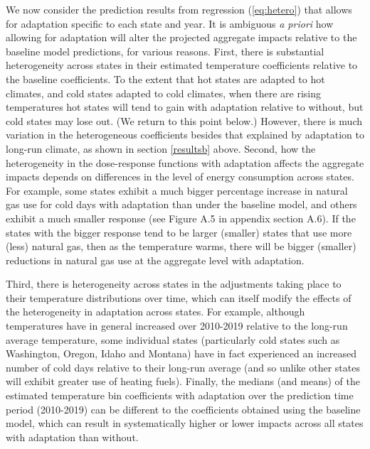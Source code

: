 \documentclass[11pt]{article}
\begin{document}
We now consider the prediction results from regression (\ref{eq:hetero}) that allows for adaptation specific to each state and year. It is ambiguous \textit{a priori} how allowing for adaptation will alter the projected aggregate impacts relative to the baseline model predictions, for various reasons. First, there is substantial heterogeneity across states in their estimated temperature coefficients relative to the baseline coefficients. To the extent that hot states are adapted to hot climates, and cold states adapted to cold climates, when there are rising temperatures hot states will tend to gain with adaptation relative to without, but cold states may lose out. (We return to this point below.) However, there is much variation in the heterogeneous coefficients besides that explained by adaptation to long-run climate, as shown in section \ref{resultsb} above. Second, how the heterogeneity in the dose-response functions with adaptation affects the aggregate impacts depends on differences in the level of energy consumption across states. For example, some states exhibit a much bigger percentage increase in natural gas use for cold days with adaptation than under the baseline model, and others exhibit a much smaller response (see Figure A.5 in appendix section A.6). If the states with the bigger response tend to be larger (smaller) states that use more (less) natural gas, then as the temperature warms, there will be bigger (smaller) reductions in natural gas use at the aggregate level with adaptation. 

Third, there is heterogeneity across states in the adjustments taking place to their temperature distributions over time, which can itself modify the effects of the heterogeneity in adaptation across states. For example, although temperatures have in general increased over 2010-2019 relative to the long-run average temperature, some individual states (particularly cold states such as Washington, Oregon, Idaho and Montana) have in fact experienced an increased number of cold days relative to their long-run average (and so unlike other states will exhibit greater use of heating fuels). Finally, the medians (and means) of the estimated temperature bin coefficients with adaptation over the prediction time period (2010-2019) can be different to the coefficients obtained using the baseline model, which can result in systematically higher or lower impacts across all states with adaptation than without. 
\end{document}
